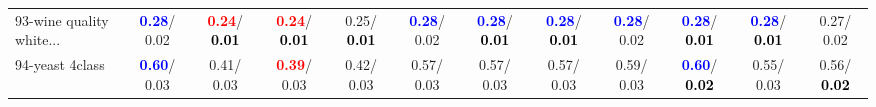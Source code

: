 \begin{table}[h]
\begin{center}
{\begin{tabular}{lc|c|c|c|c|c|c|c|c|c|c}
93-wine quality white... & \textcolor{blue}{\textbf{  0.28}}/  0.02 & \textcolor{red}{\textbf{  0.24}}/\textcolor{black}{\textbf{  0.01}} & \textcolor{red}{\textbf{  0.24}}/\textcolor{black}{\textbf{  0.01}} &   0.25/\textcolor{black}{\textbf{  0.01}} & \textcolor{blue}{\textbf{  0.28}}/  0.02 & \textcolor{blue}{\textbf{  0.28}}/\textcolor{black}{\textbf{  0.01}} & \textcolor{blue}{\textbf{  0.28}}/\textcolor{black}{\textbf{  0.01}} & \textcolor{blue}{\textbf{  0.28}}/  0.02 & \textcolor{blue}{\textbf{  0.28}}/\textcolor{black}{\textbf{  0.01}} & \textcolor{blue}{\textbf{  0.28}}/\textcolor{black}{\textbf{  0.01}} &   0.27/  0.02 \\
94-yeast 4class & \textcolor{blue}{\textbf{  0.60}}/  0.03 &   0.41/  0.03 & \textcolor{red}{\textbf{  0.39}}/  0.03 &   0.42/  0.03 &   0.57/  0.03 &   0.57/  0.03 &   0.57/  0.03 &   0.59/  0.03 & \textcolor{blue}{\textbf{  0.60}}/\textcolor{black}{\textbf{  0.02}} &   0.55/  0.03 &   0.56/\textcolor{black}{\textbf{  0.02}} \\\end{tabular}
}\label{strats2bRFw}
\end{center}
\end{table}
                                     